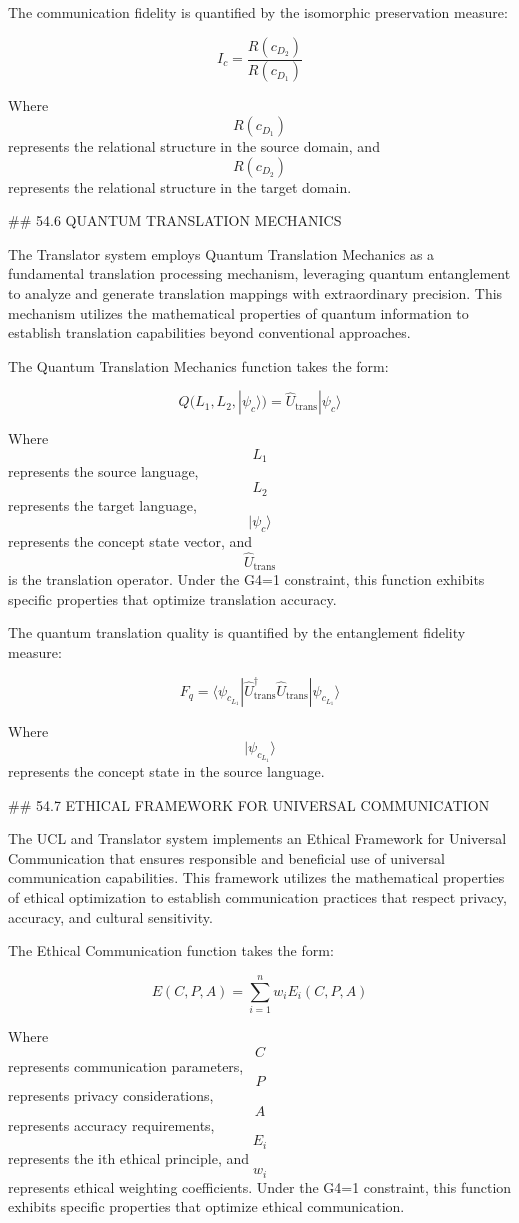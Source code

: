 The communication fidelity is quantified by the isomorphic preservation measure:

$$ I_c = \frac{R(c_{D_2})}{R(c_{D_1})} $$

Where $$ R(c_{D_1}) $$ represents the relational structure in the source domain, and $$ R(c_{D_2}) $$ represents the relational structure in the target domain.

## 54.6 QUANTUM TRANSLATION MECHANICS

The Translator system employs Quantum Translation Mechanics as a fundamental translation processing mechanism, leveraging quantum entanglement to analyze and generate translation mappings with extraordinary precision. This mechanism utilizes the mathematical properties of quantum information to establish translation capabilities beyond conventional approaches.

The Quantum Translation Mechanics function takes the form:

$$ Q(L_1, L_2, |\psi_c\rangle) = \hat{U}_{\text{trans}} |\psi_c\rangle $$

Where $$ L_1 $$ represents the source language, $$ L_2 $$ represents the target language, $$ |\psi_c\rangle $$ represents the concept state vector, and $$ \hat{U}_{\text{trans}} $$ is the translation operator. Under the G4=1 constraint, this function exhibits specific properties that optimize translation accuracy.

The quantum translation quality is quantified by the entanglement fidelity measure:

$$ F_q = \langle\psi_{c_{L_1}}|\hat{U}_{\text{trans}}^{\dagger}\hat{U}_{\text{trans}}|\psi_{c_{L_1}}\rangle $$

Where $$ |\psi_{c_{L_1}}\rangle $$ represents the concept state in the source language.

## 54.7 ETHICAL FRAMEWORK FOR UNIVERSAL COMMUNICATION

The UCL and Translator system implements an Ethical Framework for Universal Communication that ensures responsible and beneficial use of universal communication capabilities. This framework utilizes the mathematical properties of ethical optimization to establish communication practices that respect privacy, accuracy, and cultural sensitivity.

The Ethical Communication function takes the form:

$$ E(C, P, A) = \sum_{i=1}^{n} w_i E_i(C, P, A) $$

Where $$ C $$ represents communication parameters, $$ P $$ represents privacy considerations, $$ A $$ represents accuracy requirements, $$ E_i $$ represents the ith ethical principle, and $$ w_i $$ represents ethical weighting coefficients. Under the G4=1 constraint, this function exhibits specific properties that optimize ethical communication.

